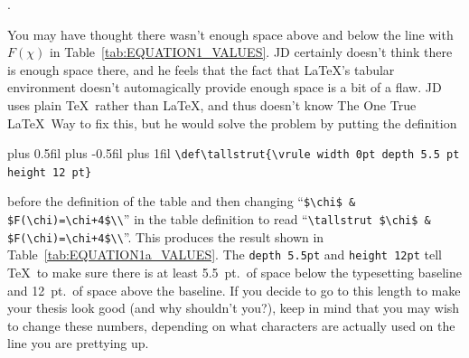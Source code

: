 \begin{table}[!ht]
    \centering
    \caption{Table of values for two other $F()$s.}
    \label{tab:EQUATION2_VALUES}.
\end{table}


You may have thought there wasn't enough space above and below the
line with $F(\chi)$ in Table~\ref{tab:EQUATION1_VALUES}.  JD certainly
doesn't think there is enough space there, and he feels that the fact
that \LaTeX's tabular environment doesn't automagically provide enough
space is a bit of a flaw.  JD uses plain \TeX\ rather than \LaTeX, and
thus doesn't know The One True \LaTeX\ Way to fix this, but he would
solve the problem by putting the definition

\begingroup
\leftskip=0cm plus 0.5fil
\rightskip=0cm plus -0.5fil
\parfillskip=0cm plus 1fil
\noindent
\verb|\def\tallstrut{\vrule width 0pt depth 5.5 pt height 12 pt}|
\par
\endgroup
\noindent
before the definition of the table and then changing
``\verb|$\chi$ & $F(\chi)=\chi+4$\\|'' in the table definition to read
``\verb|\tallstrut $\chi$ & $F(\chi)=\chi+4$\\|''.  This produces the
result shown in Table~\ref{tab:EQUATION1a_VALUES}.  The
\verb|depth 5.5pt| and \verb|height 12pt| tell \TeX\ to make sure
there is at least 5.5~pt.\ of space below the typesetting baseline and
12~pt.\ of space above the baseline.  If you decide to go to this
length to make your thesis look good (and why shouldn't you?\null),
keep in mind that you may wish to change these numbers, depending on
what characters are actually used on the line you are prettying up.

